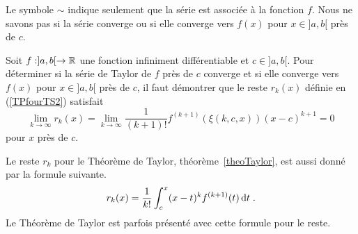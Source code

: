 {\begin{defn}
Le symbole $\sim$ indique seulement que la série est associée à la fonction
$f$.  Nous ne savons pas si la série converge ou si elle converge vers $f(x)$
pour $x\in]a,b[$ près de $c$.
\end{defn}

\begin{meth}
Soit $f:]a,b[\rightarrow \mathbb{R}$ une fonction infiniment différentiable et
$c \in ]a,b[$.  Pour déterminer si la série de Taylor de $f$ près de $c$
converge et si elle converge vers $f(x)$ pour $x\in]a,b[$ près de $c$, il
faut démontrer que le reste $r_k(x)$ définie en (\ref{TPfourTS2}) satisfait
\[
\lim_{k\rightarrow \infty} r_k(x) =
\lim_{k\rightarrow \infty}
\frac{1}{(k+1)!} f^{(k+1)}(\xi(k,c,x)) (x-c)^{k+1} = 0
\]
pour $x$ près de $c$.
\end{meth}

\begin{rmk}[\theory]
Le reste $r_k$ pour le Théorème de Taylor, théorème~\ref{theoTaylor}, est
aussi donné par la formule suivante.
\begin{equation}\label{TRest}
r_k(x) = \frac{1}{k!} \int_c^x (x-t)^k f^{(k+1)}(t) \,\mathrm{d}t \; .
\end{equation}
Le Théorème de Taylor est parfois présenté avec cette formule pour le 
reste.


\end{rmk}}
